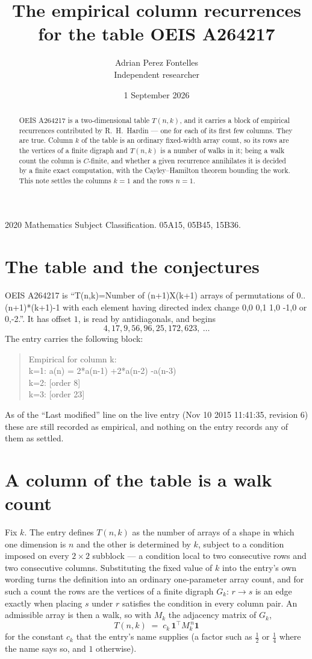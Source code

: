 \documentclass[11pt,a4paper]{article}
\title{The empirical column recurrences for the table OEIS A264217}
\author{Adrian Perez Fontelles\\ \small Independent researcher}
\date{1 September 2026}
\theoremstyle{plain}
\theoremstyle{definition}
\begin{document}
\maketitle

\begin{abstract}
OEIS A264217 is a two-dimensional table $T(n,k)$, and it carries a block of empirical
recurrences contributed by R.~H.~Hardin --- one for each of its first few columns. They are
true. Column $k$ of the table is an ordinary fixed-width array count, so its rows are the
vertices of a finite digraph and $T(n,k)$ is a number of walks in it; being a walk count the
column is $C$-finite, and whether a given recurrence annihilates it is decided by a finite
exact computation, with the Cayley--Hamilton theorem bounding the work. This note settles the columns $k=1$ and the rows $n=1$.
\end{abstract}

\noindent\small 2020 Mathematics Subject Classification. 05A15, 05B45, 15B36.\normalsize

\section{The table and the conjectures}

OEIS A264217 is ``T(n,k)=Number of (n+1)X(k+1) arrays of permutations of 0..(n+1)*(k+1)-1 with each element having directed index change 0,0 0,1 1,0 -1,0 or 0,-2.''. It has offset $1$, is
read by antidiagonals, and begins
\[
4, 17, 9, 56, 96, 25, 172, 623,\ \dots
\]
The entry carries the following block:
\begin{quote}\small
Empirical for column k:\\
k=1: a(n) = 2*a(n-1) +2*a(n-2) -a(n-3)\\
k=2: [order 8]\\
k=3: [order 23]\\
\end{quote}
As of the ``Last modified'' line on the live entry (Nov 10 2015 11:41:35, revision 6) these are still
recorded as empirical, and nothing on the entry records any of them as settled.

\section{A column of the table is a walk count}

Fix $k$. The entry defines $T(n,k)$ as the number of arrays of a shape in which one dimension
is $n$ and the other is determined by $k$, subject to a condition imposed on every
$2\times2$ subblock --- a condition local to two consecutive rows and two consecutive columns.
Substituting the fixed value of $k$ into the entry's own wording turns the definition into an
ordinary one-parameter array count, and for such a count the rows are the vertices of a finite
digraph $G_k$: $r\to s$ is an edge exactly when placing $s$ under $r$ satisfies the condition
in every column pair. An admissible array is then a walk, so with $M_k$ the adjacency matrix
of $G_k$,
\[
T(n,k)\;=\;c_k\,\mathbf{1}^{\!\top}M_k^{\,n}\mathbf{1}
\]
for the constant $c_k$ that the entry's name supplies (a factor such as $\tfrac12$ or
$\tfrac14$ where the name says so, and $1$ otherwise).
\end{document}
